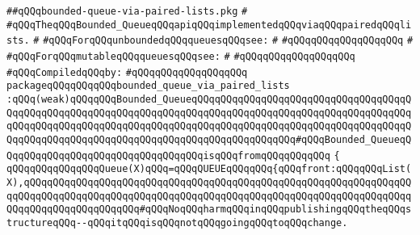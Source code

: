 \label{src/lib/src/bounded-queue-via-paired-lists.pkg}
\verb|##qQQqbounded-queue-via-paired-lists.pkg|\newline
\verb|#|\newline
\verb|#qQQqTheqQQqBounded_QueueqQQqapiqQQqimplementedqQQqviaqQQqpairedqQQqlists.|\newline
\verb|#|\newline
\verb|#qQQqForqQQqunboundedqQQqqueuesqQQqsee:|\newline
\verb|#|\newline
\verb|#qQQqqQQqqQQqqQQqqQQq|\newline
\verb|#|\newline
\verb|#qQQqForqQQqmutableqQQqqueuesqQQqsee:|\newline
\verb|#|\newline
\verb|#qQQqqQQqqQQqqQQqqQQq|\newline
\newline
\verb|#qQQqCompiledqQQqby:|\newline
\verb|#qQQqqQQqqQQqqQQqqQQq|\newline
\newline
\newline
\newline
\newline
\newline
\verb|packageqQQqqQQqqQQqbounded_queue_via_paired_lists|\newline
\verb|:qQQq(weak)qQQqqQQqBounded_QueueqQQqqQQqqQQqqQQqqQQqqQQqqQQqqQQqqQQqqQQqqQQqqQQqqQQqqQQqqQQqqQQqqQQqqQQqqQQqqQQqqQQqqQQqqQQqqQQqqQQqqQQqqQQqqQQqqQQqqQQqqQQqqQQqqQQqqQQqqQQqqQQqqQQqqQQqqQQqqQQqqQQqqQQqqQQqqQQqqQQqqQQqqQQqqQQqqQQqqQQqqQQqqQQqqQQqqQQqqQQqqQQqqQQq#qQQqBounded_QueueqQQqqQQqqQQqqQQqqQQqqQQqqQQqqQQqqQQqisqQQqfromqQQqqQQqqQQq|\newline
\verb|{|\newline
\verb|qQQqqQQqqQQqqQQqQueue(X)qQQq=qQQqQUEUEqQQqqQQq{qQQqfront:qQQqqQQqList(X),qQQqqQQqqQQqqQQqqQQqqQQqqQQqqQQqqQQqqQQqqQQqqQQqqQQqqQQqqQQqqQQqqQQqqQQqqQQqqQQqqQQqqQQqqQQqqQQqqQQqqQQqqQQqqQQqqQQqqQQqqQQqqQQqqQQqqQQqqQQqqQQqqQQqqQQqqQQqqQQq#qQQqNoqQQqharmqQQqinqQQqpublishingqQQqtheqQQqstructureqQQq--qQQqitqQQqisqQQqnotqQQqgoingqQQqtoqQQqchange.|\newline
